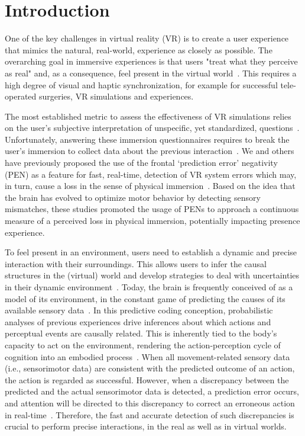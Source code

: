 \section{Introduction} 

One of the key challenges in virtual reality (VR) is to create a user experience that mimics the natural, real-world, experience as closely as possible. The overarching goal in immersive experiences is that users "treat what they perceive as real" and, as a consequence, feel present in the virtual world~\cite{Slater2009-au}. This requires a high degree of visual and haptic synchronization, for example for successful tele-operated surgeries, VR simulations and experiences.

The most established metric to assess the effectiveness of VR simulations relies on the user’s subjective interpretation of unspecific, yet standardized, questions~\cite{Schubert2003-sq, Witmer1998-ew}. Unfortunately, answering these immersion questionnaires requires to break the user’s immersion to collect data about the previous interaction~\cite{Slater1999-dm}. We and others have previously proposed the use of the frontal `prediction error' negativity (PEN) as a feature for fast, real-time, detection of VR system errors which may, in turn, cause a loss in the sense of physical immersion~\cite{Gehrke2019-og, Si-mohammed2020-ru, Singh2018-qi}. Based on the idea that the brain has evolved to optimize motor behavior by detecting sensory mismatches, these studies promoted the usage of PENs to approach a continuous measure of a perceived loss in physical immersion, potentially impacting presence experience.

To feel present in an environment, users need to establish a dynamic and precise interaction with their surroundings. This allows users to infer the causal structures in the (virtual) world and develop strategies to deal with uncertainties in their dynamic environment~\cite{Knill2004-sz}. Today, the brain is frequently conceived of as a model of its environment, in the constant game of predicting the causes of its available sensory data~\cite{Clark2013-ah, Friston2010-hy, Rao1999-zr}. In this predictive coding conception, probabilistic analyses of previous experiences drive inferences about which actions and perceptual events are causally related. This is inherently tied to the body’s capacity to act on the environment, rendering the action-perception cycle of cognition into an embodied process~\cite{Friston2012-gq}. When all movement-related sensory data (i.e., sensorimotor data) are consistent with the predicted outcome of an action, the action is regarded as successful. However, when a discrepancy between the predicted and the actual sensorimotor data is detected, a prediction error occurs, and attention will be directed to this discrepancy to correct an erroneous action in real-time~\cite{Savoie2018-ad}. Therefore, the fast and accurate detection of such discrepancies is crucial to perform precise interactions, in the real as well as in virtual worlds.


